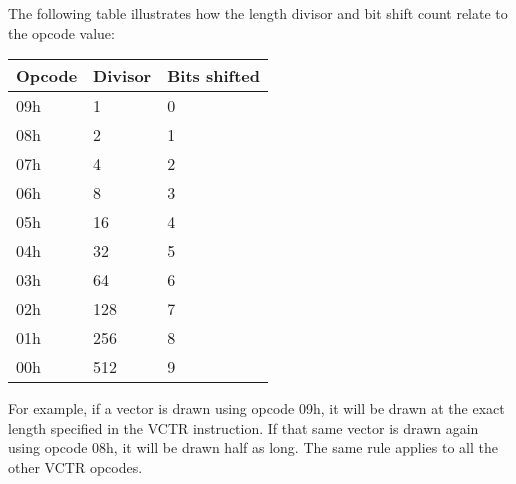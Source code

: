 \begin{minipage}{\textwidth}
The following table illustrates how the length divisor and bit shift count
relate to the opcode value:

\begin{tabular}{|l|l|l|}
	\hline
	{\bf Opcode}	&	{\bf Divisor}	&	{\bf Bits shifted}	\\ \hline
	09h				&	1				&	0					\\ \hline
	08h				&	2				&	1					\\ \hline
	07h				&	4				&	2					\\ \hline
	06h				&	8				&	3					\\ \hline
	05h				&	16				&	4					\\ \hline
	04h				&	32				&	5					\\ \hline
	03h				&	64				&	6					\\ \hline
	02h				&	128				&	7					\\ \hline
	01h				&	256				&	8					\\ \hline
	00h				&	512				&	9					\\ \hline
\end{tabular}

For example, if a vector is drawn using opcode 09h, it will be drawn at the
exact length specified in the VCTR instruction. If that same vector is drawn
again using opcode 08h, it will be drawn half as long. The same rule applies to
all the other VCTR opcodes.

\vspace{1 cm}
\end{minipage}


